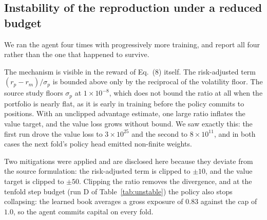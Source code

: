 \documentclass[conference]{IEEEtran}
\begin{document}
\subsection{Instability of the reproduction under a reduced budget}
\label{sec:instability}

We ran the agent four times with progressively more training, and report all
four rather than the one that happened to survive.

\begin{table}[t]
\centering
\footnotesize
{}
\caption{Four attempts to reproduce AlphaZeroBeta inside the available compute budget. Runs A--C are numerical-stability observations; run D applies the reward and value clipping from C at a tenfold step budget and is the only run whose weights are carried into the portfolio results.}
\label{tab:unstable}
\end{table}

The mechanism is visible in the reward of Eq.~(8) itself. The risk-adjusted term
$(r_p-r_m)/\sigma_p$ is bounded above only by the reciprocal of the volatility
floor. The source study floors $\sigma_p$ at $1\times10^{-8}$, which does not
bound the ratio at all when the portfolio is nearly flat, as it is early in
training before the policy commits to positions. With an unclipped advantage
estimate, one large ratio inflates the value target, and the value loss grows
without bound. We saw exactly this: the first run drove the value loss to
$3\times10^{25}$ and the second to $8\times10^{11}$, and in both cases the next
fold's policy head emitted non-finite weights.

Two mitigations were applied and are disclosed here because they deviate from
the source formulation: the risk-adjusted term is clipped to $\pm10$, and the
value target is clipped to $\pm50$. Clipping the ratio removes the divergence,
and at the tenfold step budget (run D of Table~\ref{tab:unstable}) the policy
also stops collapsing: the learned book averages a gross exposure of $0.83$
against the cap of $1.0$, so the agent commits capital on every fold.
\end{document}

